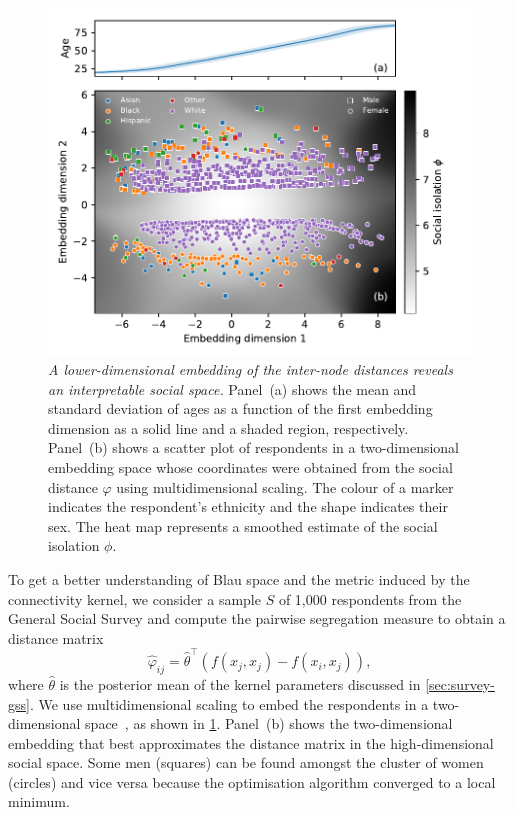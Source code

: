\documentclass{scrartcl}
\newcommand{\transpose}[1]{#1^\intercal}
\newcommand{\titlecaption}[2]{\caption[#1]{\emph{#1} #2}}
\begin{document}
\begin{figure}
    \includegraphics{segregation-embedding}
    \titlecaption{A lower-dimensional embedding of the inter-node distances reveals an interpretable social space.}{Panel~(a) shows the mean and standard deviation of ages as a function of the first embedding dimension as a solid line and a shaded region, respectively. Panel~(b) shows a scatter plot of respondents in a two-dimensional embedding space whose coordinates were obtained from the social distance $\varphi$ using multidimensional scaling. The colour of a marker indicates the respondent's ethnicity and the shape indicates their sex. The heat map represents a smoothed estimate of the social isolation $\phi$.\label{fig:segregation-embedding}}
\end{figure}

To get a better understanding of Blau space and the metric induced by the connectivity kernel, we consider a sample $S$ of 1,000 respondents from the General Social Survey and compute the pairwise segregation measure to obtain a distance matrix
\[
    \hat\varphi_{ij} = \transpose{\hat\theta}\left(f(x_j, x_j)-f(x_i, x_j)\right),
\]
where $\hat\theta$ is the posterior mean of the kernel parameters discussed in \cref{sec:survey-gss}. We use multidimensional scaling to embed the respondents in a two-dimensional space~\cite{Borg1996}, as shown in \cref{fig:segregation-embedding}. Panel~(b) shows the two-dimensional embedding that best approximates the distance matrix in the high-dimensional social space. Some men (squares) can be found amongst the cluster of women (circles) and vice versa because the optimisation algorithm converged to a local minimum.
\end{document}
